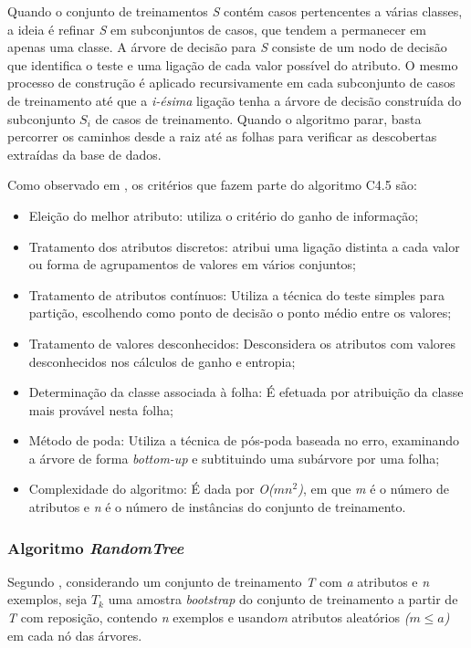 \documentclass[
	12pt,				%
	openright,			%
	oneside,	
	a4paper,				%
	english,				%
	brazil				%
]{abntex2/abntex2} %
\begin{document}
	Quando o conjunto de treinamentos \textit{S} contém casos pertencentes a várias classes, a ideia é refinar \textit{S} em subconjuntos de casos, que tendem a permanecer em apenas uma classe. A árvore de decisão para \textit{S} consiste de um nodo de decisão que identifica o teste e uma ligação de cada valor possível do atributo. O mesmo processo de construção é aplicado recursivamente em cada subconjunto de casos de treinamento até que a \textit{i-ésima} ligação tenha a árvore de decisão construída do subconjunto \textit{$S_i$} de casos de treinamento. Quando o algoritmo parar, basta percorrer os caminhos desde a raiz até as folhas para verificar as descobertas extraídas da base de dados.
	
	Como observado em \cite{halmenschlager:2002}, os critérios que fazem parte do algoritmo C4.5 são:
	
	\begin{itemize}
		\item Eleição do melhor atributo: utiliza o critério do ganho de informação;
		\item Tratamento dos atributos discretos: atribui uma ligação distinta a cada valor ou forma de agrupamentos de valores em vários conjuntos;
		\item Tratamento de atributos contínuos: Utiliza a técnica do teste simples para partição, escolhendo como ponto de decisão o ponto médio entre os valores;
		\item Tratamento de valores desconhecidos: Desconsidera os atributos com valores desconhecidos nos cálculos de ganho e entropia;
		\item Determinação da classe associada à folha: É efetuada por atribuição da classe mais provável nesta folha;
		\item Método de poda: Utiliza a técnica de pós-poda baseada no erro, examinando a árvore de forma \textit{bottom-up} e subtituindo uma subárvore por uma folha;
		\item Complexidade do algoritmo: É dada por \textit{O($mn^{2}$)}, em que \textit{m} é o número de atributos e \textit{n} é o número de instâncias do conjunto de treinamento. 
	\end{itemize}
	\vspace{-1.5\baselineskip}
	\subsubsection{Algoritmo \textit{RandomTree}}
	\vspace{1\baselineskip}
	Segundo \cite{oshiro:2013}, considerando um conjunto de treinamento \textit{T} com \textit{a} atributos e \textit{n} exemplos, seja \textit{$T_k$} uma amostra \textit{bootstrap} do conjunto de treinamento a partir de \textit{T} com reposição, contendo \textit{n} exemplos e usando\textit{m} atributos aleatórios \textit{($m\le a$)} em cada nó das árvores.
	
\end{document}
